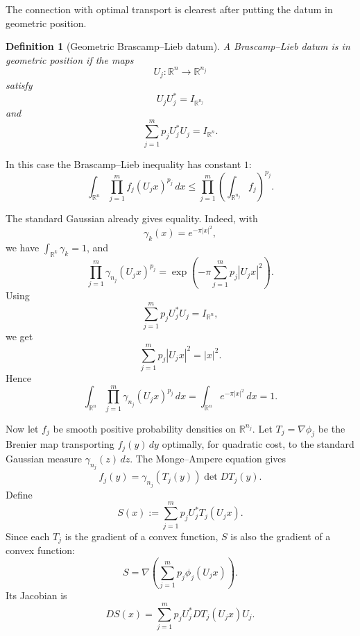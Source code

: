 \documentclass[11pt]{article}
\newtheorem{definition}{Definition}
\begin{document}
The connection with optimal transport is clearest after putting the datum in
geometric position.

\begin{definition}[Geometric Brascamp--Lieb datum]
A Brascamp--Lieb datum is in geometric position if the maps
\[
        U_j:\mathbb R^n\to \mathbb R^{n_j}
\]
satisfy
\[
        U_jU_j^*=I_{\mathbb R^{n_j}}
\]
and
\[
        \sum_{j=1}^m p_jU_j^*U_j=I_{\mathbb R^n}.
\]
\end{definition}

In this case the Brascamp--Lieb inequality has constant \(1\):
\[
        \int_{\mathbb R^n}
        \prod_{j=1}^m f_j(U_jx)^{p_j}\,dx
        \leq
        \prod_{j=1}^m
        \left(\int_{\mathbb R^{n_j}}f_j\right)^{p_j}.
\]

The standard Gaussian already gives equality. Indeed, with
\[
        \gamma_k(x)=e^{-\pi |x|^2},
\]
we have \(\int_{\mathbb R^k}\gamma_k=1\), and
\[
        \prod_{j=1}^m \gamma_{n_j}(U_jx)^{p_j}
        =
        \exp\left(
        -\pi\sum_{j=1}^m p_j|U_jx|^2
        \right).
\]
Using
\[
        \sum_{j=1}^m p_jU_j^*U_j=I_{\mathbb R^n},
\]
we get
\[
        \sum_{j=1}^m p_j|U_jx|^2=|x|^2.
\]
Hence
\[
        \int_{\mathbb R^n}
        \prod_{j=1}^m \gamma_{n_j}(U_jx)^{p_j}\,dx
        =
        \int_{\mathbb R^n}e^{-\pi |x|^2}\,dx
        =
        1.
\]

Now let \(f_j\) be smooth positive probability densities on
\(\mathbb R^{n_j}\). Let \(T_j=\nabla\phi_j\) be the Brenier map transporting
\(f_j(y)\,dy\) optimally, for quadratic cost, to the standard Gaussian measure
\(\gamma_{n_j}(z)\,dz\). The Monge--Ampere equation gives
\[
        f_j(y)
        =
        \gamma_{n_j}(T_j(y))\det DT_j(y).
\]
Define
\[
        S(x)
        :=
        \sum_{j=1}^m p_jU_j^*T_j(U_jx).
\]
Since each \(T_j\) is the gradient of a convex function, \(S\) is also the
gradient of a convex function:
\[
        S=\nabla\left(\sum_{j=1}^m p_j\phi_j(U_jx)\right).
\]
Its Jacobian is
\[
        DS(x)
        =
        \sum_{j=1}^m
        p_jU_j^*DT_j(U_jx)U_j.
\]
\end{document}
